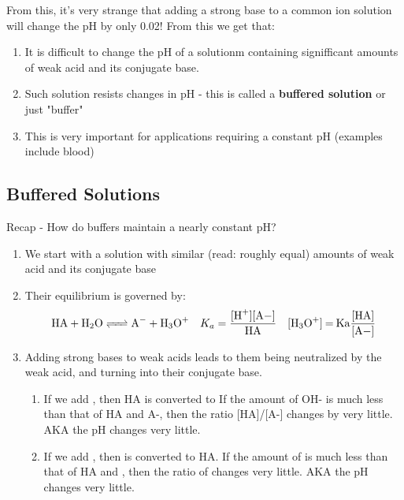 \documentclass[../CHEM152Notes.tex]{subfiles}
\begin{document}
From this, it's very strange that adding a strong base to a common ion solution will change the pH by only 0.02! From this we get that:
\begin{enumerate}
    \item It is difficult to change the pH of a solutionm containing signifficant amounts of weak acid and its conjugate base.
    \item Such solution resists changes in pH - this is called a \textbf{buffered solution} or just "buffer"
    \item This is very important for applications requiring a constant pH (examples include blood)
\end{enumerate}

\subsection*{Buffered Solutions}
Recap - How do buffers maintain a nearly constant pH?
\begin{enumerate}
    \item We start with a solution with similar (read: roughly equal) amounts of weak acid and its conjugate base
    \item Their equilibrium is governed by:
    \begin{equation*}
        \begin{aligned}
            \ce{HA + H2O <=> A- + H3O+} \quad K_a = \ce{\frac{[H+][A-]}{HA}} \quad \ce{[H3O+] = Ka\frac{[HA]}{[A-]}}
        \end{aligned}
    \end{equation*}
    \item Adding strong bases to weak acids leads to them being neutralized by the weak acid, and turning into their conjugate base. 
    \begin{enumerate}
        \item If we add , then HA is converted to  If the amount of OH- is much less than that of HA and A-, then the ratio [HA]/[A-] changes by very little. AKA the pH changes very little.
        \item If we add , then  is converted to HA. If the amount of  is much less than that of HA and , then the ratio of \ce{[HA]/[A-]} changes very little. AKA the pH changes very little.
    \end{enumerate}
\end{enumerate}
\end{document}
